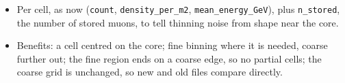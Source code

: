 \documentclass[11pt]{article}
\begin{document}
\begin{itemize}
\item Per cell, as now (\texttt{count}, \texttt{density\_per\_m2}, \texttt{mean\_energy\_GeV}), plus
  \texttt{n\_stored}, the number of stored muons, to tell thinning noise from shape near the core.
\item Benefits: a cell centred on the core; fine binning where it is needed, coarse further out; the
  fine region ends on a coarse edge, so no partial cells; the coarse grid is unchanged, so new and old
  files compare directly.
\end{itemize}
\end{document}

